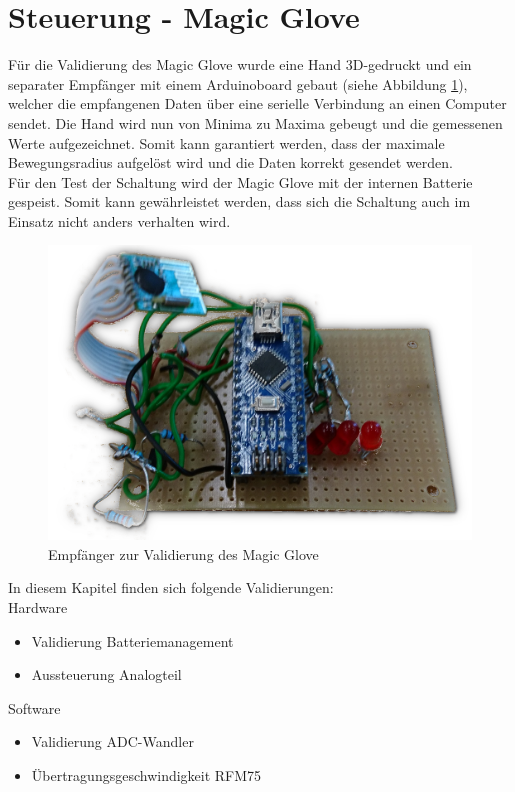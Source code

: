 \section{Steuerung - Magic Glove} \label{ValidSteuerMagicGlove}
Für die Validierung des Magic Glove wurde eine Hand 3D-gedruckt und ein separater Empfänger mit einem Arduinoboard gebaut (siehe Abbildung \ref{fig:receiver}), welcher die empfangenen Daten über eine serielle Verbindung an einen Computer sendet. Die Hand wird nun von Minima zu Maxima gebeugt und die gemessenen Werte aufgezeichnet. Somit kann garantiert werden, dass der maximale Bewegungsradius aufgelöst wird und die Daten korrekt gesendet werden.\\
Für den Test der Schaltung wird der Magic Glove mit der internen Batterie gespeist. Somit kann gewährleistet werden, dass sich die Schaltung auch im Einsatz nicht anders verhalten wird. 

\begin{figure} [H]
	\centering
	\includegraphics[scale=0.2]{images/receiver}
	\caption{Empfänger zur Validierung des Magic Glove}
	\label{fig:receiver}
\end{figure}

In diesem Kapitel finden sich folgende Validierungen:\\
Hardware
\begin{itemize}
	\item Validierung Batteriemanagement
	\item Aussteuerung Analogteil
\end{itemize}
Software
\begin{itemize}
	\item Validierung ADC-Wandler
	\item Übertragungsgeschwindigkeit RFM75
\end{itemize}

